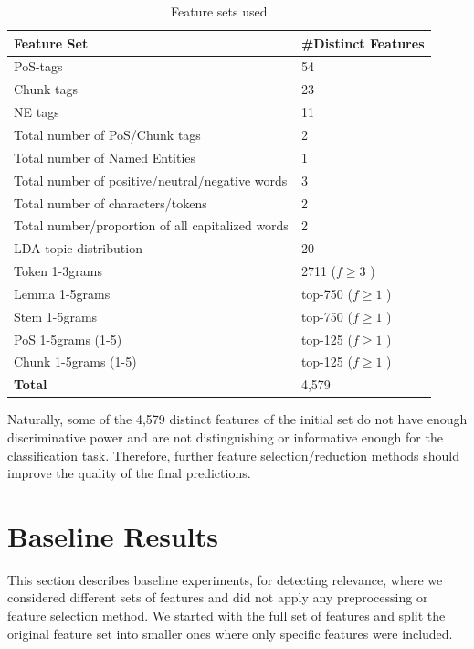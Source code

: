 \begin{table}[!htpb]
\centering
\footnotesize
\begin{tabular}{|l|l|}
\hline
\textbf{Feature Set} & \textbf{\#Distinct Features} 
\\
\hline
PoS-tags & 54 \\
Chunk tags & 23 \\
NE tags & 11 \\
Total number of PoS/Chunk tags & 2 \\
Total number of Named Entities & 1 \\
Total number of positive/neutral/negative words & 3 \\
Total number of characters/tokens & 2 \\
Total number/proportion of all capitalized words & 2 \\
LDA topic distribution & 20 \\
Token 1-3grams & 2711 ($f \geq 3$ ) \\
Lemma 1-5grams & top-750 ($f \geq 1$ ) \\
Stem 1-5grams & top-750 ($f \geq 1$ ) \\
PoS 1-5grams (1-5) & top-125 ($f \geq 1$ ) \\
Chunk 1-5grams (1-5) & top-125 ($f \geq 1$ ) \\
\hline
\textbf{Total} & 4,579 \\
\hline
\end{tabular}
\caption[Feature sets used]{Feature sets used}
\label{table-features}
\end{table}  

Naturally, some of the 4,579 distinct features of the initial set do not have enough discriminative power and are not distinguishing or informative enough for the classification task. Therefore, further feature selection/reduction methods should improve the quality of the final predictions.

\section{Baseline Results}
\label{sec:baseline-experiements}

This section describes baseline experiments, for detecting relevance, where we considered different sets of features and did not apply any preprocessing or feature selection method. We started with the full set of features and split the original feature set into smaller ones where only specific features were included. 

